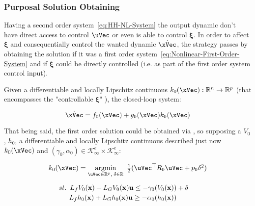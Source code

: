 \subsubsection{Purposal Solution Obtaining}
\label{subsub:quadratic_program_formulation}

Having a second order system~\ref{eq:HH-NL-System} the output dynamic don't have direct access to control \(\uVec\) or even is able to control \(\mathbf{\xi}\). In order to affect \(\mathbf{\xi}\) and consequentially control the wanted dynamic \(\dot{\xVec}\), the strategy passes by obtaining the solution if it was a first order system~\ref{eq:Nonlinear-First-Order-System} and if \(\mathbf{\xi}\) could be directly controlled (i.e. as part of the first order system control input). \par

Given a differentiable and locally Lipschitz continuous \(k_0(\xVec):\mathbb{R}^n \to \mathbb{R}^p\) (that encompasses the "controllable \(\mathbf{\xi}\)" ), the closed-loop system:

\begin{equation}
    \dot{\xVec} = f_0(\xVec) + g_0(\xVec) k_0(\xVec)\\ 
 \label{eq:NL-CL-System-0Backstep}
\end{equation}

That being said, the first order solution could be obtained via , so supposing a  \(V_0\),   \(h_0\),  a differentiable and locally Lipschitz continuous described just now \(k_0(\xVec)\) and \((\gamma_0, \alpha_0) \in \mathcal{K}^e_\infty \times \mathcal{K}^e_\infty\):

\begin{equation}
    \begin{array}{l}
        k_0(\xVec) = \underset{\uVec \in \mathbb{R}^p, \hspace{0.2em} \delta \in \mathbb{R}}{\mathrm{argmin}} \quad \hspace{-0.5em} \frac{1}{2} (\uVec^\top R_0 \uVec + p_0\delta^2 ) \vspace{1em} \\ 
        \quad \hspace{0.5em}  st. \hspace{0.5em} L_fV_0(\mathbf{x}) + L_GV_0(\mathbf{x})\mathbf{u} \leq -\gamma_0(V_0(\mathbf{x})) + \delta \vspace{0.25em}\\
        \quad \quad \hspace{1em} L_fh_0(\mathbf{x}) + L_Gh_0(\mathbf{x})\mathbf{u} \geq -\alpha_0(h_0(\mathbf{x}))
    \end{array}
 \label{eq:CLF-CBF-QP-relaxed-0Backstep}
\end{equation}


